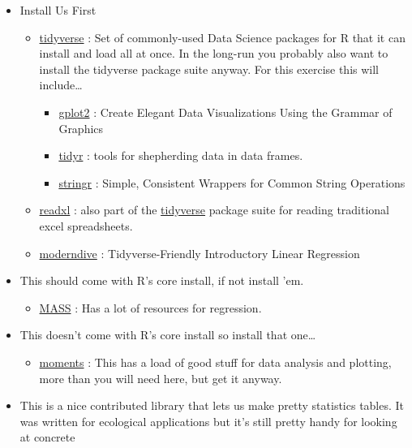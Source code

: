 \documentclass[]{article}
\providecommand{\tightlist}{%
  \setlength{\itemsep}{0pt}\setlength{\parskip}{0pt}}
\begin{document}
\begin{itemize}
\tightlist
\item
  Install Us First

  \begin{itemize}
  \tightlist
  \item
    \href{https://www.tidyverse.org}{tidyverse} : Set of commonly-used
    Data Science packages for R that it can install and load all at
    once. In the long-run you probably also want to install the
    tidyverse package suite anyway. For this exercise this will
    include\ldots{}

    \begin{itemize}
    \tightlist
    \item
      \href{https://ggplot2.tidyverse.org}{gplot2} : Create Elegant Data
      Visualizations Using the Grammar of Graphics
    \item
      \href{https://tidyr.tidyverse.org}{tidyr} : tools for shepherding
      data in data frames.
    \item
      \href{https://stringr.tidyverse.org}{stringr} : Simple, Consistent
      Wrappers for Common String Operations
    \end{itemize}
  \item
    \href{https://www.rdocumentation.org/packages/readxl/versions/1.1.0}{readxl}
    : also part of the \href{https://www.tidyverse.org}{tidyverse}
    package suite for reading traditional excel spreadsheets.\\
  \item
    \href{Tidyverse-Friendly\%20Introductory\%20Linear\%20Regression}{moderndive}
    : Tidyverse-Friendly Introductory Linear Regression
  \end{itemize}
\item
  This should come with R's core install, if not install 'em.

  \begin{itemize}
  \tightlist
  \item
    \href{https://www.rdocumentation.org/packages/MASS/versions/7.3-50}{MASS}
    : Has a lot of resources for regression.
  \end{itemize}
\item
  This doesn't come with R's core install so install that one\ldots{}

  \begin{itemize}
  \tightlist
  \item
    \href{https://www.rdocumentation.org/packages/moments/versions/0.14}{moments}
    : This has a load of good stuff for data analysis and plotting, more
    than you will need here, but get it anyway.
  \end{itemize}
\item
  This is a nice contributed library that lets us make pretty statistics
  tables. It was written for ecological applications but it's still
  pretty handy for looking at concrete


\end{itemize}
\end{document}
